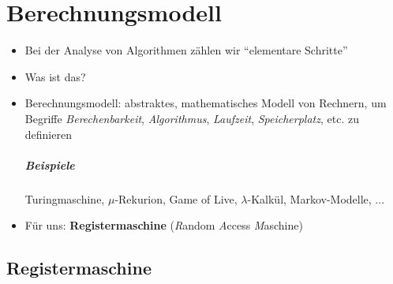 \chapter{Berechnungsmodell}
\begin{itemize}
 \item Bei der Analyse von Algorithmen zählen wir "`elementare Schritte"'
 \item Was ist das?
 \item Berechnungsmodell: abstraktes, mathematisches Modell von Rechnern, um Begriffe \emph{Berechenbarkeit}, \emph{Algorithmus}, \emph{Laufzeit}, \emph{Speicherplatz}, etc. zu definieren
      \paragraph{Beispiele} Turingmaschine, $\mu$-Rekurion, Game of Live, $\lambda$-Kalkül, Markov-Modelle, ...
 \item Für uns: \textbf{Registermaschine} (\emph{R}andom \emph{A}ccess \emph{M}aschine)
\end{itemize}
\section{Registermaschine}
